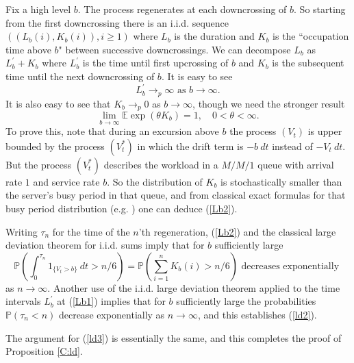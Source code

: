 \documentclass[12pt]{article}
\newcommand{\Ex}{{\mathbb E}}
\renewcommand{\Pr}{{\mathbb P}}
\newcommand{\indic}{1}
\begin{document}
Fix a high level $b$.
The process regenerates at each downcrossing of $b$. 
So starting from the first downcrossing there is an
 i.i.d. sequence $((L_b(i), K_b(i)), i \ge 1)$ where $L_b$ is the duration  and $K_b$ is the ``occupation time above $b$" between successive downcrossings. 
We can decompose $L_b$ as $L^\prime_b + K_b$ where 
$L^\prime_b$ is the time until first upcrossing of $b$ and 
$K_b$ is the subsequent time until the next downcrossing of $b$.
It is easy to see
\begin{equation}
L^\prime_b \to_p \infty \mbox{ as } b \to \infty .
\label{Lb1}
\end{equation}
It is also easy to see that $K_b \to_p 0$ as $b \to \infty$, 
though we need the stronger result  
\begin{equation}
\lim_{b \to \infty} \Ex \exp(\theta K_b) = 1, \quad 0 < \theta < \infty.
\label{Lb2}
\end{equation}
To prove this, note that during an excursion above $b$ the process $(V_t)$ is upper bounded by the process $(V^*_t)$ in
which the drift term is $-b \ dt$ instead of $- V_t \ dt$.  But the process $(V^*_t)$ describes the workload in a $M/M/1$ queue with arrival rate $1$ 
and service rate $b$.  
So the distribution of $K_b$ is stochastically smaller than the server's busy period in that queue, and from classical exact formulas for that busy period distribution
(e.g.  \cite{asmussen}) one can deduce (\ref{Lb2}).

Writing $\tau_n$ for the time of the $n$'th regeneration, (\ref{Lb2}) 
and the classical large deviation theorem for i.i.d. sums  imply that for $b$ sufficiently large
\[
\Pr \left( \int_0^{\tau_n} \indic_{ \{V_t > b \}} \ dt  > n/6 \right) 
= \Pr \left(\sum_{i=1}^n K_b(i) > n/6 \right) 
\mbox{ decreases exponentially } 
\]
as $n \to \infty$.
Another use of the i.i.d. large deviation theorem applied to the time intervals $L^\prime_b$  at (\ref{Lb1}) implies that for $b$ sufficiently large the probabilities 
$\Pr( \tau_n < n)$  decrease exponentially as $n \to \infty$, and this establishes (\ref{ld2}).

The argument for (\ref{ld3}) is essentially the same, and this
completes the proof of Proposition  \ref{C:ld}.
\end{document}
